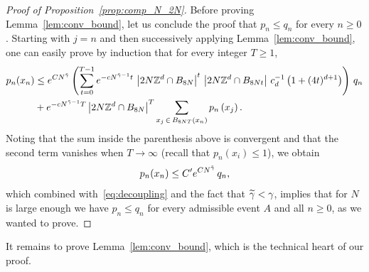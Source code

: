 \documentclass[AHL,Unicode,longabstracts,published]{cedram}
\newcommand{\Z}{\mathbb{Z}}
\let\oldtilde\tilde
\renewcommand*{\tilde}[1]{\mathchoice{\widetilde{#1}}{\widetilde{#1}}{\oldtilde{#1}}{\oldtilde{#1}}}
\newcommand{\Z}{\mathbb{Z}}
\begin{document}
\begin{proof}[Proof of Proposition~\ref{prop:comp_N_2N}]
Before proving Lemma~\ref{lem:conv_bound}, let us conclude the proof that $p_n\leq q_n$ for every $n\geq0$. Starting with $j=n$ and then successively applying Lemma~\ref{lem:conv_bound}, one can easily prove by induction that for every integer $T\geq1$,
\begin{align*}
\begin{split}
p_n(x_n) & \leq e^{CN^{\tilde{\gamma}}} \left(\sum_{t=0}^{T-1} e^{-cN^{\tilde{\gamma}-1}t}\, \left|2N\Z^d\cap B_{8N}\right|^t\, \left|2N\Z^d\cap B_{8Nt}\right|\, c_d^{-1}\left(1+(4t)^{d+1}\right)\right)\,q_n \\
& +e^{-cN^{\tilde{\gamma}-1}T} \left|2N\Z^d\cap B_{8N}\right|^T \sum_{x_j\,\in\,B_{8NT}\left(x_n\right)} p_n\left(x_j\right).
\end{split}
\end{align*}
Noting that the sum inside the parenthesis above is convergent and that the second term vanishes when $T\to\infty$ (recall that $p_n(x_i)\leq1$), we obtain
\begin{equation*}
p_n(x_n)\leq C'e^{CN^{\tilde{\gamma}}}\,q_n,
\end{equation*}
which combined with~\eqref{eq:decoupling} and the fact that $\tilde{\gamma}<\gamma$, implies that for $N$ is large enough we have $p_n\leq q_n$ for every admissible event $A$ and all $n\geq0$, as we wanted to prove.
\end{proof}

It remains to prove Lemma~\ref{lem:conv_bound}, which is the technical heart of our proof.
\end{document}
